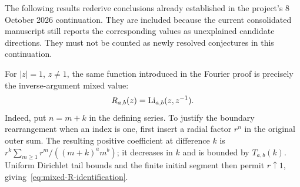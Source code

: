 The following results rederive conclusions already established in the
project's 8 October 2026 continuation. They are included because the
current consolidated manuscript still reports the corresponding values
as unexplained candidate directions. They must not be counted as newly
resolved conjectures in this continuation.

For $|z|=1$, $z\ne1$, the same function introduced in the Fourier proof is
precisely the inverse-argument mixed value:
\begin{equation}\label{eq:mixed-R-identification}
 R_{a,b}(z)=\operatorname{Li}_{a,b}(z,z^{-1}).
\end{equation}
Indeed, put $n=m+k$ in the defining series. To justify the boundary
rearrangement when an index is one, first insert a radial factor $r^n$ in
the original outer sum. The resulting positive coefficient at difference
$k$ is
$r^k\sum_{m\ge1}r^m/((m+k)^a m^b)$; it decreases in $k$ and is bounded
by $T_{a,b}(k)$. Uniform Dirichlet tail bounds and the finite initial
segment then permit $r\uparrow1$, giving~\eqref{eq:mixed-R-identification}.

